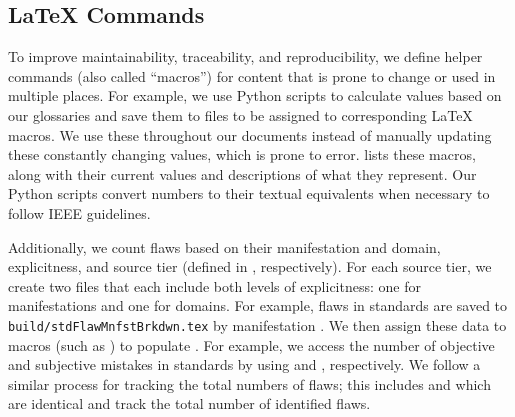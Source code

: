 \clearpage
\subsection[LaTeX Commands]{\LaTeX{} Commands}\label{macros}
To improve maintainability, traceability, and reproducibility, we define
helper commands (also called ``macros'') for content that is prone to change
or used in multiple places. For example, we use Python scripts to calculate
values based on our glossaries and save them to files to be assigned to
corresponding \LaTeX{} macros. We use these throughout our documents instead of
manually updating these constantly changing values, which is prone to error.
 lists these macros, along with their current values and
descriptions of what they represent. Our Python scripts convert numbers to
their textual equivalents when necessary to follow IEEE guidelines.



\label{flawCounts}
Additionally, we count flaws based on their manifestation and domain,
explicitness, and source tier (defined in , respectively).
For each source tier, we create two files that each include both levels of
explicitness: one for manifestations and one for domains. For example, flaws in
standards are saved to \texttt{build/stdFlawMnfstBrkdwn.tex} by manifestation%
. We then assign these data to macros (such as ) to
populate . For example, we access the number
of objective and subjective mistakes in standards by using
 and , respectively.
We follow a similar process for tracking the total numbers of flaws; this
includes  and 
which are identical and track the total number of identified flaws.

